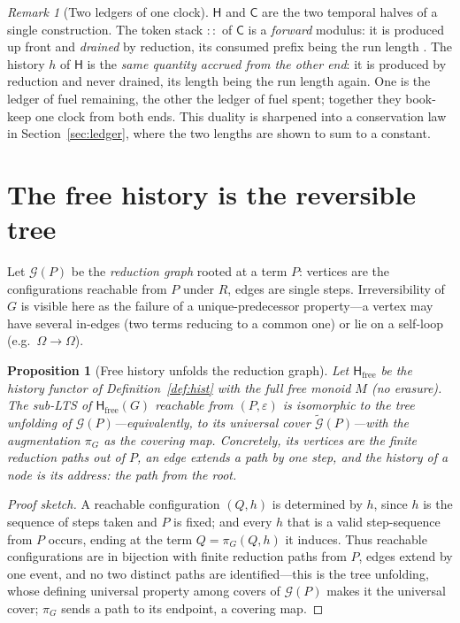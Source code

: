 \documentclass[11pt]{article}
\theoremstyle{definition}
\theoremstyle{plain}
\newtheorem{proposition}[definition]{Proposition}
\theoremstyle{remark}
\newtheorem{remark}[definition]{Remark}
\newcommand{\cost}{\mathsf{C}}
\newcommand{\hist}{\mathsf{H}}
\newcommand{\Grph}{\mathcal{G}}
\newcommand{\cover}{\widetilde{\mathcal{G}}}
\newcommand{\emptyhist}{\varepsilon}
\begin{document}
\begin{remark}[Two ledgers of one clock]\label{rmk:duality}
$\hist$ and $\cost$ are the two temporal halves of a single construction. The token stack $::$ of
$\cost$ is a \emph{forward} modulus: it is produced up front and \emph{drained} by reduction, its
consumed prefix being the run length \cite[Prop.~4.1]{CE}. The history $h$ of $\hist$ is the
\emph{same quantity accrued from the other end}: it is produced by reduction and never drained, its
length being the run length again. One is the ledger of fuel remaining, the other the ledger of
fuel spent; together they book-keep one clock from both ends. This duality is sharpened into a
conservation law in Section~\ref{sec:ledger}, where the two lengths are shown to sum to a constant.
\end{remark}

\section{The free history is the reversible tree}
\label{sec:tree}

Let $\Grph(P)$ be the \emph{reduction graph} rooted at a term $P$: vertices are the configurations
reachable from $P$ under $R$, edges are single steps. Irreversibility of $G$ is visible here as the
failure of a unique-predecessor property---a vertex may have several in-edges (two terms reducing to
a common one) or lie on a self-loop (e.g.\ $\Omega\to\Omega$).

\begin{proposition}[Free history unfolds the reduction graph]\label{prop:cover}
Let $\hist_{\mathrm{free}}$ be the history functor of Definition~\ref{def:hist} with the full free
monoid $M$ (no erasure). The sub-LTS of $\hist_{\mathrm{free}}(G)$ reachable from
$(P,\emptyhist)$ is isomorphic to the tree unfolding of $\Grph(P)$---equivalently, to its universal
cover $\cover(P)$---with the augmentation $\pi_G$ as the covering map. Concretely, its vertices are
the finite reduction \emph{paths} out of $P$, an edge extends a path by one step, and the history
of a node is its address: the path from the root.
\end{proposition}

\begin{proof}[Proof sketch]
A reachable configuration $(Q,h)$ is determined by $h$, since $h$ is the sequence of steps taken
and $P$ is fixed; and every $h$ that is a valid step-sequence from $P$ occurs, ending at the term
$Q=\pi_G(Q,h)$ it induces. Thus reachable configurations are in bijection with finite reduction
paths from $P$, edges extend by one event, and no two distinct paths are identified---this is the
tree unfolding, whose defining universal property among covers of $\Grph(P)$ makes it the universal
cover; $\pi_G$ sends a path to its endpoint, a covering map.
\end{proof}
\end{document}
